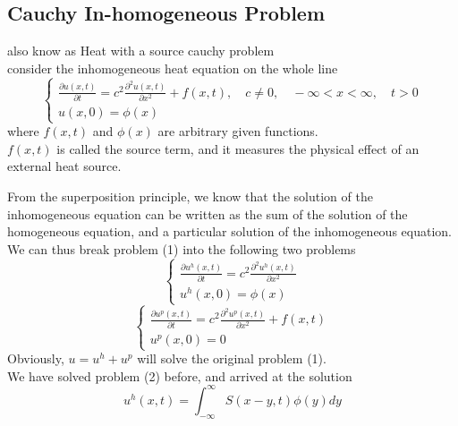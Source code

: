 \documentclass[]{article}
\begin{document}
\setcounter{equation}{0}
\subsection{Cauchy In-homogeneous Problem}
also know as Heat with a source cauchy problem
\\
consider the inhomogeneous heat equation on the whole line
\begin{equation}
    \begin{cases}
        \displaystyle \frac{\partial u\left(x,t \right)}{\partial t} = c^2 \frac{\partial^2 u(x,t)}{\partial x^2} + f(x,t),\quad c\neq 0,\quad-\infty<x<\infty,\quad t>0
        \\
        u\left(x,0 \right) = \phi\left(x\right)
    \end{cases}
\end{equation}
where $f(x, t)$ and $\phi(x)$ are arbitrary given functions. 
\\$f(x, t)$ is called the source term, and it measures the physical effect of an external heat source.
\par
From the superposition principle, we know that the solution of the inhomogeneous equation can
be written as the sum of the solution of the homogeneous equation, and a particular solution of the
inhomogeneous equation. We can thus break problem (1) into the following two problems
\begin{equation}
    \begin{cases}
        \displaystyle \frac{\partial u^h\left(x,t \right)}{\partial t} = c^2 \frac{\partial^2 u^h(x,t)}{\partial x^2}
        \\
        u^h\left(x,0 \right) = \phi\left(x\right)
    \end{cases}
\end{equation}
\begin{equation}
    \begin{cases}
        \displaystyle \frac{\partial u^p\left(x,t \right)}{\partial t} = c^2 \frac{\partial^2 u^p(x,t)}{\partial x^2}+ f(x,t)
        \\
        u^p\left(x,0 \right) = 0
    \end{cases}
\end{equation}
Obviously, $u = u^h + u^p$ will solve the original problem (1).
\\
We have solved problem (2) before, and arrived at the solution
\begin{equation}
    u^h(x,t) = \int_{-\infty}^{\infty}S(x-y,t) \phi(y)dy        
\end{equation}
\end{document}
